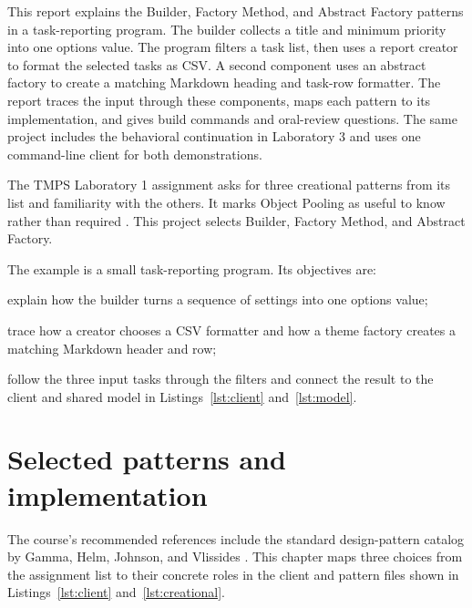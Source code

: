 \documentclass{utmreport}
\begin{document}
\makeutmreporttitlepage
\tableofcontents

\begin{utmabstract}[Abstract]
This report explains the Builder, Factory Method, and Abstract Factory patterns in a task-reporting program. The builder collects a title and minimum priority into one options value. The program filters a task list, then uses a report creator to format the selected tasks as CSV. A second component uses an abstract factory to create a matching Markdown heading and task-row formatter. The report traces the input through these components, maps each pattern to its implementation, and gives build commands and oral-review questions. The same project includes the behavioral continuation in Laboratory 3 and uses one command-line client for both demonstrations.

\end{utmabstract}

\utmintroduction
The TMPS Laboratory 1 assignment asks for three creational patterns from its list and familiarity with the others. It marks Object Pooling as useful to know rather than required \cite{brief,repo}. This project selects Builder, Factory Method, and Abstract Factory.

The example is a small task-reporting program. Its objectives are:
\begin{utmenumerate}
\item explain how the builder turns a sequence of settings into one options value;
\item trace how a creator chooses a CSV formatter and how a theme factory creates a matching Markdown header and row;
\item follow the three input tasks through the filters and connect the result to the client and shared model in Listings~\ref{lst:client} and~\ref{lst:model}.
\end{utmenumerate}

\chapter{Selected patterns and implementation}
The course's recommended references include the standard design-pattern catalog by Gamma, Helm, Johnson, and Vlissides \cite{patterns}. This chapter maps three choices from the assignment list to their concrete roles in the client and pattern files shown in Listings~\ref{lst:client} and~\ref{lst:creational}.
\end{document}

